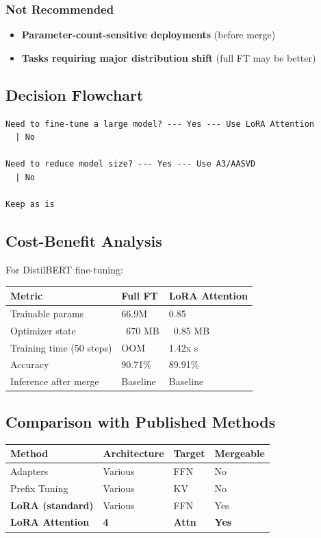 \subsubsection{Not Recommended}
\begin{itemize}
\item \textbf{Parameter-count-sensitive deployments} (before merge)
\item \textbf{Tasks requiring major distribution shift} (full FT may be better)

\end{itemize}
\subsection{Decision Flowchart}

\begin{lstlisting}
Need to fine-tune a large model? --- Yes --- Use LoRA Attention
  | No
   
Need to reduce model size? --- Yes --- Use A3/AASVD
  | No
   
Keep as is
\end{lstlisting}

\subsection{Cost-Benefit Analysis}

For DistilBERT fine-tuning:

\begin{table}[H]
\centering
\small
\begin{tabular}{lll}
\toprule
\textbf{Metric} & \textbf{Full FT} & \textbf{LoRA Attention} \\
\midrule
Trainable params & 66.9M & 0.85 \\
Optimizer state & ~670 MB & ~0.85 MB \\
Training time (50 steps) & OOM & 1.42x s \\
Accuracy & 90.71\% & 89.91\% \\
Inference after merge & Baseline & Baseline \\
\bottomrule
\end{tabular}
\end{table}

\subsection{Comparison with Published Methods}

\begin{table}[H]
\centering
\small
\begin{tabular}{llll}
\toprule
\textbf{Method} & \textbf{Architecture} & \textbf{Target} & \textbf{Mergeable} \\
\midrule
Adapters & Various & FFN & No \\
Prefix Tuning & Various & KV & No \\
\textbf{LoRA (standard)} & Various & FFN & Yes \\
\textbf{LoRA Attention} & \textbf{4} & \textbf{Attn} & \textbf{Yes} \\
\bottomrule
\end{tabular}
\end{table}

